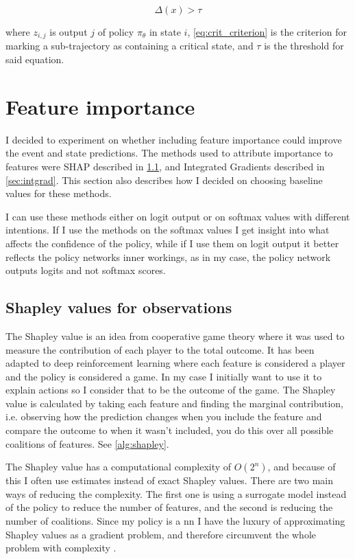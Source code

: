 \documentclass[UKenglish]{uiomasterthesis}
\begin{document}
\begin{equation}
\label{eq:crit_criterion}
\Delta(x) > \tau
\end{equation}

where $z_{i,j}$ is output $j$ of policy $\pi_\theta$ in state $i$, \cref{eq:crit_criterion} is the criterion for marking a sub-trajectory as containing a critical state, and $\tau$ is the threshold for said equation.

\section{Feature importance}
\label{sec:feat_imp_meth}
I decided to experiment on whether including feature importance could improve the event and state predictions. The methods used to attribute importance to features were SHAP described in \cref{sec:shap_meth}, and Integrated Gradients described in \cref{sec:intgrad}. This section also describes how I decided on choosing baseline values for these methods.

I can use these methods either on logit output or on softmax values with different intentions. If I use the methods on the softmax values I get insight into what affects the confidence of the policy, while if I use them on logit output it better reflects the policy networks inner workings, as in my case, the policy network outputs logits and not softmax scores.

\subsection{Shapley values for observations}
\label{sec:shap_meth}
The Shapley value is an idea from cooperative game theory where it was used to measure the contribution of each player to the total outcome. It has been adapted to deep reinforcement learning where each feature is considered a player and the policy is considered a game. In my case I initially want to use it to explain actions so I consider that to be the outcome of the game. The Shapley value is calculated by taking each feature and finding the marginal contribution, i.e. observing how the prediction changes when you include the feature and compare the outcome to when it wasn't included, you do this over all possible coalitions of features. See \cref{alg:shapley}.

The Shapley value has a computational complexity of $O(2^n)$, and because of this I often use estimates instead of exact Shapley values. There are two main ways of reducing the complexity. The first one is using a surrogate model instead of the policy to reduce the number of features, and the second is reducing the number of coalitions. Since my policy is a \ac{nn} I have the luxury of approximating Shapley values as a gradient problem, and therefore circumvent the whole problem with complexity \cite{captum_shap}.
\end{document}
